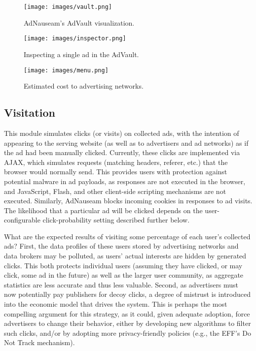 \documentclass[conference]{IEEEtran}
\begin{document}
\begin{figure}[!t]
\centering
\texttt{[image: images/vault.png]}
\caption{AdNauseam's AdVault visualization.}
\label{fig:vault}
\vspace{2mm}
\texttt{[image: images/inspector.png]}
\caption{Inspecting a single ad in the AdVault.}
\label{fig:inspector}
\vspace{2mm}
\texttt{[image: images/menu.png]}
\caption{Estimated cost to advertising networks.}
\label{fig:menu}
\end{figure}


\subsection{Visitation}

This module simulates clicks (or visits) on collected ads, with the intention of appearing to the serving website (as well as to advertisers and ad networks) as if the ad had been manually clicked. Currently, these clicks are implemented via AJAX, which simulates requests (matching headers, referer, etc.) that the browser would normally send. This provides users with protection against potential malware in ad payloads, as responses are not executed in the browser, and JavaScript, Flash, and other client-side scripting mechanisms are not executed. Similarly, AdNauseam blocks incoming cookies in responses to ad visits. The likelihood that a particular ad will be clicked depends on the user-configurable click-probability setting described further below.

What are the expected results of visiting some percentage of each user's collected ads? First, the data profiles of these users stored by advertising networks and data brokers may be polluted, as users' actual interests are hidden by generated clicks. This both protects individual users (assuming they have clicked, or may click, some ad in the future) as well as the larger user community, as aggregate statistics are less accurate and thus less valuable. Second, as advertisers must now potentially pay publishers for decoy clicks, a degree of mistrust is introduced into the economic model that drives the system. This is perhaps the most compelling argument for this strategy, as it could, given adequate adoption, force advertisers to change their behavior, either by developing new algorithms to filter such clicks, and/or by adopting more privacy-friendly policies (e.g., the EFF's Do Not Track mechanism).
\end{document}

